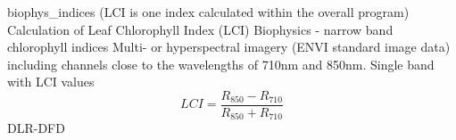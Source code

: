 { %
biophys\_indices (LCI is one index calculated within the overall program)
}
{ %
Calculation of Leaf Chlorophyll Index (LCI)
}
{ %
Biophysics - narrow band chlorophyll indices
}
{ %
Multi- or hyperspectral imagery (ENVI standard image data) including channels close to the wavelengths of 710nm and 850nm.\bigskip
}
{ %
Single band with LCI values
}
{ %
\begin{displaymath}
LCI = \frac{R_{850}-R_{710}}{R_{850}+R_{710}}
\end{displaymath}
}
{ %
DLR-DFD
}
{ %

}


